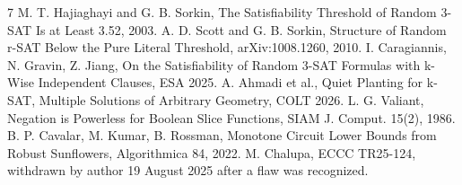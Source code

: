 \documentclass[11pt]{article}
\begin{document}
\begin{thebibliography}{7}
 M. T. Hajiaghayi and G. B. Sorkin, The Satisfiability Threshold of Random 3-SAT Is at Least 3.52, 2003.
 A. D. Scott and G. B. Sorkin, Structure of Random r-SAT Below the Pure Literal Threshold, arXiv:1008.1260, 2010.
 I. Caragiannis, N. Gravin, Z. Jiang, On the Satisfiability of Random 3-SAT Formulas with k-Wise Independent Clauses, ESA 2025.
 A. Ahmadi et al., Quiet Planting for k-SAT, Multiple Solutions of Arbitrary Geometry, COLT 2026.
 L. G. Valiant, Negation is Powerless for Boolean Slice Functions, SIAM J. Comput. 15(2), 1986.
 B. P. Cavalar, M. Kumar, B. Rossman, Monotone Circuit Lower Bounds from Robust Sunflowers, Algorithmica 84, 2022.
 M. Chalupa, ECCC TR25-124, withdrawn by author 19 August 2025 after a flaw was recognized.
\end{thebibliography}
\end{document}
